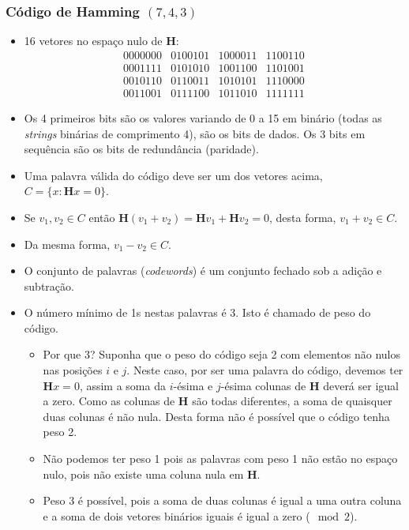 \begin{frame}[allowframebreaks]
  \frametitle{Código de Hamming $(7,4,3)$}

  \begin{itemize}
  \item 16 vetores no espaço nulo de $\mathbf{H}$:
	\begin{equation}
	\begin{matrix}
	0000000 & 0100101 & 1000011 & 1100110 \\
	0001111 & 0101010 & 1001100 & 1101001 \\ 
	0010110 & 0110011 & 1010101 & 1110000 \\
	0011001 & 0111100 & 1011010 & 1111111
	\end{matrix}
	\end{equation}
  \item Os 4 primeiros bits são os valores variando de 0 a 15 em binário (todas as \textit{strings} binárias de comprimento 4),
	são os bits de dados. Os 3 bits em sequência são os bits de redundância (paridade).
  \item Uma palavra válida do código deve ser um dos vetores acima, $C = \{x : \mathbf{H} x = 0 \}$.
  \item Se $v_1, v_2 \in C$ então $\mathbf{H} (v_1 + v_2) = \mathbf{H} v_1 + \mathbf{H} v_2 = 0$, desta forma,
	$v_1 + v_2 \in C$.
  \item Da mesma forma, $v_1 - v_2 \in C$.
  \item O conjunto de palavras (\textit{codewords}) é um conjunto fechado sob a adição e subtração.
  \item O número mínimo de 1s nestas palavras é 3. Isto é chamado de peso do código. 
	\begin{itemize}
	\item Por que 3? Suponha que o peso do código seja 2 com elementos não nulos nas posições $i$ e $j$.
	Neste caso, por ser uma palavra do código, devemos ter $\mathbf{H} x = 0$, assim a soma 
	da $i$-ésima e $j$-ésima colunas de $\mathbf{H}$ deverá ser igual a zero. Como as colunas de $\mathbf{H}$
	são todas diferentes, a soma de quaisquer duas colunas é não nula. Desta forma não é possível que o código tenha peso 2.
	\item Não podemos ter peso 1 pois as palavras com peso 1 não estão no espaço nulo, pois não existe uma coluna nula em $\mathbf{H}$. 
	\item Peso 3 é possível, pois a soma de duas colunas é igual a uma outra coluna e a soma de dois vetores binários iguais
	é igual a zero ($\mod 2$).

\end{itemize}
\end{itemize}
\end{frame}
